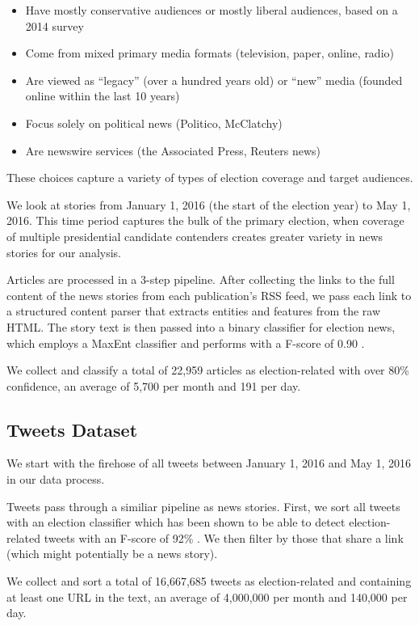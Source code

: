 \documentclass[letterpaper]{article}
\begin{document}
\begin{itemize}
\item Have mostly conservative audiences or mostly liberal audiences, based on a 2014 survey \cite{PoliticalPolarization}
\item Come from mixed primary media formats (television, paper, online, radio)
\item Are viewed as ``legacy'' (over a hundred years old) or ``new'' media (founded online within the last 10 years)
\item Focus solely on political news (Politico, McClatchy)
\item Are newswire services (the Associated Press, Reuters news)
\end{itemize}
 
These choices capture a variety of types of election coverage and target audiences.
 
 We look at stories from January 1, 2016 (the start of the election year) to May 1, 2016. This time period captures the bulk of the primary election, when coverage of multiple presidential candidate contenders creates greater variety in news stories for our analysis.

Articles are processed in a 3-step pipeline. After collecting the links to the full content of the news stories from each publication's RSS feed, we pass each link to a structured content parser that extracts entities and features from the raw HTML. The story text is then passed into a binary classifier for election news, which employs a MaxEnt classifier and performs with a F-score of 0.90 \cite{vijayaraghavan-thesis}. 

 We collect and classify a total of 22,959 articles as election-related with over 80\% confidence, an average of 5,700 per month and 191 per day.


\subsection{Tweets Dataset}
We start with the firehose of all tweets between January 1, 2016 and May 1, 2016 in our data process. 

Tweets pass through a similiar pipeline as news stories. First, we sort all tweets with an election classifier which has been shown to be able to detect election-related tweets with an F-score of 92\% \cite{vvr_electome2016}. We then filter by those that share a link (which might potentially be a news story). 

We collect and sort a total of 16,667,685 tweets as election-related and containing at least one URL in the text, an average of 4,000,000 per month and 140,000 per day.
\end{document}
